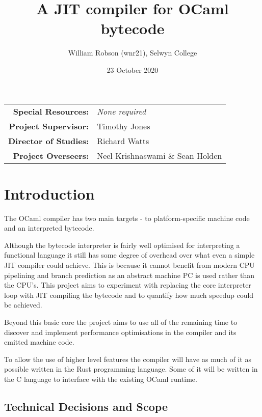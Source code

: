 \documentclass[12pt,a4paper, headings=standardclasses]{scrartcl}
\begin{document}
\title{A JIT compiler for OCaml bytecode}
\author{William Robson (wnr21), Selwyn College}
\date{23 October 2020}

\maketitle

\begin{center}
      \begin{tabular}{rl}
            \textbf{Special Resources:}   & \textit{None required}           \\
            \textbf{Project Supervisor:}  & Timothy Jones                    \\
            \textbf{Director of Studies:} & Richard Watts                    \\
            \textbf{Project Overseers:}   & Neel Krishnaswami \& Sean Holden \\
      \end{tabular}
\end{center}

\vspace{2cm}

\section*{Introduction}

The OCaml compiler has two main targets - to platform-specific machine code
and an interpreted bytecode.

Although the bytecode interpreter is fairly well optimised for interpreting a
functional language it still has some degree of overhead over what even a
simple JIT compiler could achieve. This is because it cannot benefit from
modern CPU pipelining and branch prediction as an abstract machine PC is used
rather than the CPU's. This project aims to experiment with replacing the
core interpreter loop with JIT compiling the bytecode and to quantify how
much speedup could be achieved.

Beyond this basic core the project aims to use all of the remaining time to
discover and implement performance optimisations in the compiler and its
emitted machine code.

To allow the use of higher level features the compiler will have as much of
it as possible written in the Rust programming language. Some of it will be
written in the C language to interface with the existing OCaml runtime.

\subsection*{Technical Decisions and Scope}
\end{document}
